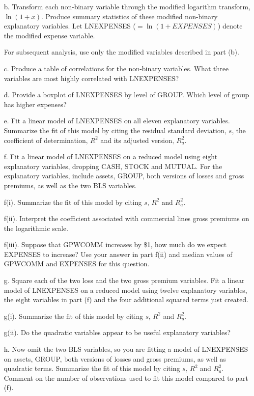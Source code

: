 \begin{exercises}
b. Transform each non-binary variable through the modified logarithm
transform, $\ln(1+x)$. Produce summary statistics of these modified
non-binary explanatory variables. Let LNEXPENSES
($=\ln(1+EXPENSES)$) denote the modified expense variable.

For subsequent analysis, use only the modified variables described
in part (b).

c. Produce a table of correlations for the non-binary variables.
What three variables are most highly correlated with LNEXPENSES?

d. Provide a boxplot of LNEXPENSES by level of GROUP. Which level of
group has higher expenses?

e. Fit a linear model of LNEXPENSES on all eleven explanatory
variables. Summarize the fit of this model by citing the residual
standard deviation, $s$, the coefficient of determination, $R^2$ and
its adjusted version, $R^2_a$.

f. Fit a linear model of LNEXPENSES on a reduced model using eight
explanatory variables, dropping CASH, STOCK and MUTUAL. For the
explanatory variables, include assets, GROUP, both versions of
losses and gross premiums, as well as the two BLS variables.

f(i). Summarize the fit of this model by citing $s$, $R^2$ and
$R^2_a$.

f(ii). Interpret the coefficient associated with commercial lines
gross premiums on the logarithmic scale.

f(iii). Suppose that GPWCOMM increases by \$1, how much do we expect
EXPENSES to increase? Use your answer in part f(ii) and median
values of GPWCOMM and EXPENSES for this question.

g. Square each of the two loss and the two gross premium variables.
Fit a linear model of LNEXPENSES on a reduced model using twelve
explanatory variables, the eight variables in part (f) and the four
additional squared terms just created.

g(i). Summarize the fit of this model by citing  $s$,  $R^2$ and
$R^2_a$.

g(ii). Do the quadratic variables appear to be useful explanatory
variables?


h. Now omit the two BLS variables, so you are fitting a model of
LNEXPENSES on assets, GROUP, both versions of losses and gross
premiums, as well as quadratic terms. Summarize the fit of this
model by citing $s$, $R^2$ and $R^2_a$. Comment on the number of
observations used to fit this model compared to part (f).


\end{exercises}
